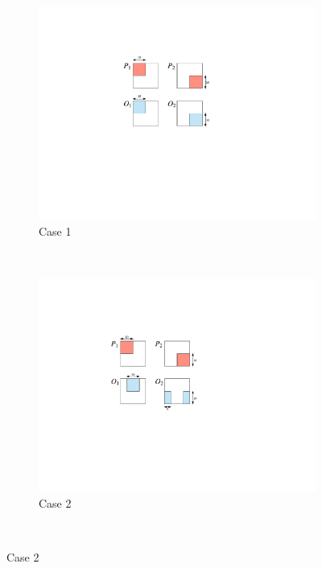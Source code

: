 	\begin{figure}
		\centering
		\begin{subfigure}[b]{0.15\textwidth}
			\includegraphics[width=\textwidth]{./img/case1-2}
			\caption{Case 1}
			\label{fig:case1}
		\end{subfigure}
		~ %
		\begin{subfigure}[b]{0.15\textwidth}
			\includegraphics[width=\textwidth]{./img/case2-2}
			\caption{Case 2}
			\label{fig:case2}
		\end{subfigure}
		~ %

\end{figure}
